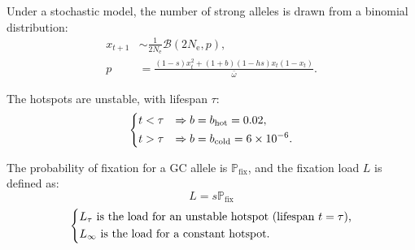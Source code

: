 \documentclass[8pt,aspectratio=169]{beamer}
\newcommand{\Ne}{N_{\text{e}}}
\newcommand{\proba}{\mathbb{P}}
\newcommand{\pfix}{\proba_{\text{fix}}}
\begin{document}
    \begin{frame}
        Under a stochastic model, the number of strong alleles is drawn from a binomial distribution:
        \begin{align*}
            x_{t+1} & \sim \frac{1}{2 \Ne}\mathcal{B} \left( 2 \Ne, p \right), \\
            p &= \frac{(1 - s)x_{t}^2 + (1 + b)(1 - h s)x_{t} (1 - x_{t})}{\bar{\omega}}.
        \end{align*}
    \end{frame}
    \begin{frame}
        The hotspots are unstable, with lifespan $\tau$:
        \begin{gather*}
            \begin{dcases}
                t < \tau & \Rightarrow b=b_{\text{hot}}=0.02, \\
                t > \tau & \Rightarrow b=b_{\text{cold}}=6\times 10^{-6}. \\
            \end{dcases}
        \end{gather*}
    \end{frame}
    \begin{frame}
        The probability of fixation for a GC allele is $\pfix$, and the fixation load $L$ is defined as:
        \begin{equation*}
            L= s \pfix
        \end{equation*}
        \begin{equation*}
            \begin{dcases}
                L_{\tau} \text{ is the load for an unstable hotspot (lifespan $t=\tau$),} \\
                L_{\infty} \text{ is the load for a constant hotspot.}
            \end{dcases}
        \end{equation*}
    \end{frame}
\end{document}
